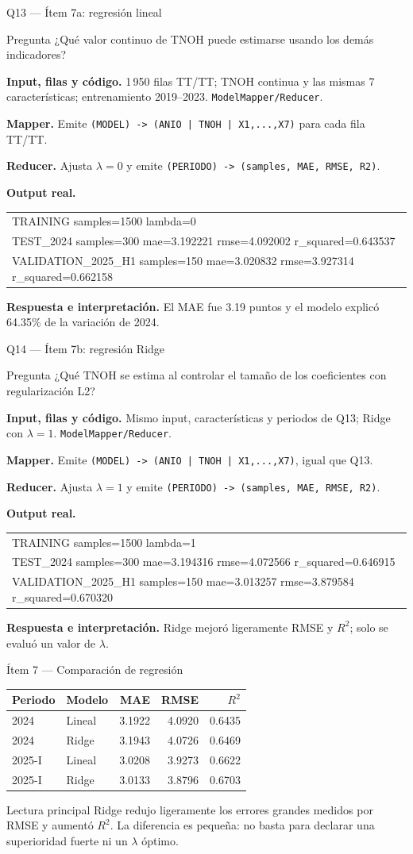 \documentclass{beamer}
\newcommand{\queryframe}[7]{%
\begin{frame}{#1}
\scriptsize
\begin{alertblock}{Pregunta}
#2
\end{alertblock}
\textbf{Input, filas y código.} #3

\vspace{0.45em}
\textbf{Mapper.} #4

\vspace{0.45em}
\textbf{Reducer.} #5

\vspace{0.45em}
\textbf{Output real.} {\ttfamily\tiny #6}

\vspace{0.45em}
\textbf{Respuesta e interpretación.} #7
\end{frame}
}
\begin{document}
\queryframe{Q13 — Ítem 7a: regresión lineal}
{¿Qué valor continuo de TNOH puede estimarse usando los demás indicadores?}
{1\,950 filas TT/TT; TNOH continua y las mismas 7 características; entrenamiento 2019--2023. \texttt{ModelMapper/Reducer}.}
{Emite \texttt{(MODEL) -> (ANIO | TNOH | X1,...,X7)} para cada fila TT/TT.}
{Ajusta $\lambda=0$ y emite \texttt{(PERIODO) -> (samples, MAE, RMSE, R2)}.}
{\begin{tabular}{@{}l@{}}
TRAINING samples=1500 lambda=0 \\
TEST\_2024 samples=300 mae=3.192221 rmse=4.092002 r\_squared=0.643537 \\
VALIDATION\_2025\_H1 samples=150 mae=3.020832 rmse=3.927314 r\_squared=0.662158
\end{tabular}}
{El MAE fue 3.19 puntos y el modelo explicó 64.35\% de la variación de 2024.}

\queryframe{Q14 — Ítem 7b: regresión Ridge}
{¿Qué TNOH se estima al controlar el tamaño de los coeficientes con regularización L2?}
{Mismo input, características y periodos de Q13; Ridge con $\lambda=1$. \texttt{ModelMapper/Reducer}.}
{Emite \texttt{(MODEL) -> (ANIO | TNOH | X1,...,X7)}, igual que Q13.}
{Ajusta $\lambda=1$ y emite \texttt{(PERIODO) -> (samples, MAE, RMSE, R2)}.}
{\begin{tabular}{@{}l@{}}
TRAINING samples=1500 lambda=1 \\
TEST\_2024 samples=300 mae=3.194316 rmse=4.072566 r\_squared=0.646915 \\
VALIDATION\_2025\_H1 samples=150 mae=3.013257 rmse=3.879584 r\_squared=0.670320
\end{tabular}}
{Ridge mejoró ligeramente RMSE y $R^2$; solo se evaluó un valor de $\lambda$.}

\begin{frame}{Ítem 7 — Comparación de regresión}
\scriptsize
\begin{table}
\centering
\begin{tabular}{llrrr}
\toprule
\textbf{Periodo} & \textbf{Modelo} & \textbf{MAE} & \textbf{RMSE} & \textbf{$R^2$} \\
\midrule
2024 & Lineal & 3.1922 & 4.0920 & 0.6435 \\
2024 & Ridge & 3.1943 & 4.0726 & 0.6469 \\
2025-I & Lineal & 3.0208 & 3.9273 & 0.6622 \\
2025-I & Ridge & 3.0133 & 3.8796 & 0.6703 \\
\bottomrule
\end{tabular}
\end{table}

\begin{alertblock}{Lectura principal}
Ridge redujo ligeramente los errores grandes medidos por RMSE y aumentó $R^2$. La diferencia es pequeña: no basta para declarar una superioridad fuerte ni un $\lambda$ óptimo.
\end{alertblock}
\end{frame}
\end{document}
